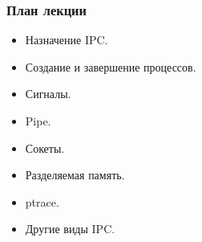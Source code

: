 \begin{frame}
\frametitle{План лекции}

\begin{itemize}
  \item Назначение IPC.
  \item Создание и завершение процессов.
  \item Сигналы.
  \item Pipe.
  \item Сокеты.
  \item Разделяемая память.
  \item ptrace.
  \item Другие виды IPC.
\end{itemize}
\end{frame}
